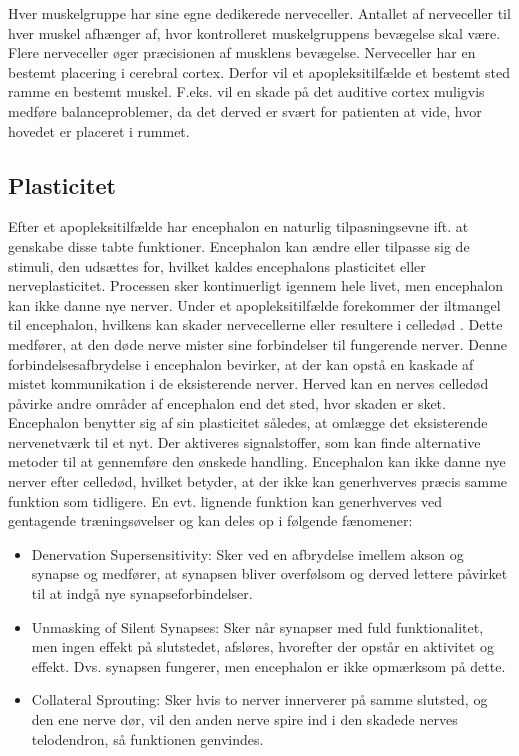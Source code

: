 Hver muskelgruppe har sine egne dedikerede nerveceller. Antallet af nerveceller til hver muskel afhænger af, hvor kontrolleret muskelgruppens bevægelse skal være. Flere nerveceller øger præcisionen af musklens bevægelse. \cite{Stanfield2014} Nerveceller har en bestemt placering i cerebral cortex. Derfor vil et apopleksitilfælde et bestemt sted ramme en bestemt muskel. F.eks. vil en skade på det auditive cortex muligvis medføre balanceproblemer, da det derved er svært for patienten at vide, hvor hovedet er placeret i rummet. \cite{Mao2014} %

\subsection{Plasticitet}
Efter et apopleksitilfælde har encephalon en naturlig tilpasningsevne ift. at genskabe disse tabte funktioner. Encephalon kan ændre eller tilpasse sig de stimuli, den udsættes for, hvilket kaldes encephalons plasticitet eller nerveplasticitet. Processen sker kontinuerligt igennem hele livet, men encephalon kan ikke danne nye nerver. \cite{Stanfield2014} Under et apopleksitilfælde forekommer der iltmangel til encephalon, hvilkens kan skader nervecellerne eller resultere i celledød \cite{Schulze2011}. Dette medfører, at den døde nerve mister sine forbindelser til fungerende nerver. Denne forbindelsesafbrydelse i encephalon bevirker, at der kan opstå en kaskade af mistet kommunikation i de eksisterende nerver. Herved kan en nerves celledød påvirke andre områder af encephalon end det sted, hvor skaden er sket. \cite{Raine2009} Encephalon benytter sig af sin plasticitet således, at omlægge det eksisterende nervenetværk til et nyt. Der aktiveres signalstoffer, som kan finde alternative metoder til at gennemføre den ønskede handling. \cite{Rugnett2015} Encephalon kan ikke danne nye nerver efter celledød, hvilket betyder, at der ikke kan generhverves præcis samme funktion som tidligere. En evt. lignende funktion kan generhverves ved gentagende træningsøvelser og kan deles op i følgende fænomener: \cite{Raine2009}

\begin{itemize}
	\item Denervation Supersensitivity: Sker ved en afbrydelse imellem akson og synapse og medfører, at synapsen bliver overfølsom og derved lettere påvirket til at indgå nye synapseforbindelser.
	\item Unmasking of Silent Synapses: Sker når synapser med fuld funktionalitet, men ingen effekt på slutstedet, afsløres, hvorefter der opstår en aktivitet og effekt. Dvs. synapsen fungerer, men encephalon er ikke opmærksom på dette.
	\item Collateral Sprouting: Sker hvis to nerver innerverer på samme slutsted, og den ene nerve dør, vil den anden nerve spire ind i den skadede nerves telodendron, så funktionen genvindes.
\end{itemize}

